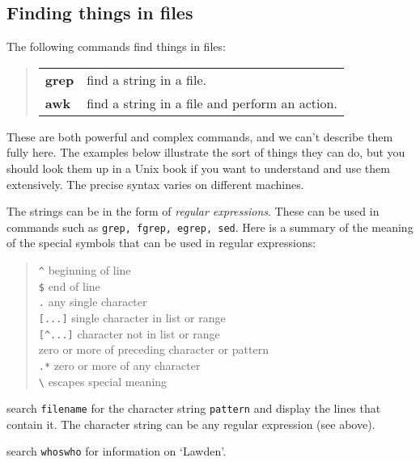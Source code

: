 \subsection{Finding things in files}

The following commands find things in files:

\begin{quote}
\begin{tabular}{lp{67mm}}

{\bf grep}  & find a string in a file.\\
{\bf awk}   & find a string in a file and perform an action.

\end{tabular}
\end{quote}

These are both powerful and complex commands, and we can't describe them fully
here.
The examples below illustrate the sort of things they can do, but you should
look them up in a Unix book if you want to understand and use them extensively.
The precise syntax varies on different machines.

The strings can be in the form of {\em regular expressions}.
These can be used in commands such as {\tt grep, fgrep, egrep, sed}.
Here is a summary of the meaning of the special symbols that can be used
in regular expressions:
\begin{quote}
\verb+^+ \hfill beginning of line \\
{\tt \$} \hfill end of line \\
{\tt .} \hfill any single character \\
{\tt [...]} \hfill single character in list or range \\
\verb+[^...]+ \hfill character not in list or range \\
{\tt *} \hfill zero or more of preceding character or pattern \\
{\tt .*} \hfill zero or more of any character \\
\verb+\+ \hfill escapes special meaning
\end {quote}

\goodbreak

\exbegin

{search {\tt filename} for the character string {\tt pattern} and display the
lines that contain it.
The character string can be any regular expression (see above).}

{search {\tt whoswho} for information on `Lawden'.}

